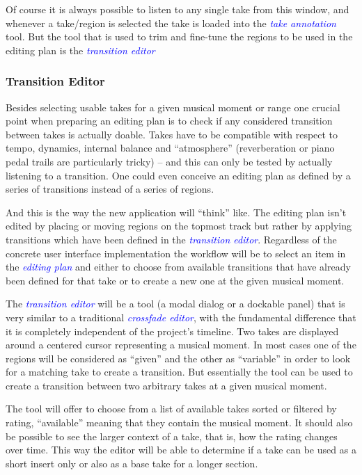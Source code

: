 \documentclass[11pt,a4paper]{article}
\newcommand*{\term}[1]{\textcolor{blue}{\emph{#1}}}
\begin{document}
Of course it is always possible to listen to any single take from this window,
and whenever a take/region is selected the take is loaded into the \term{take
annotation} tool.
But the tool that is used to trim and fine-tune the regions to be used in the
editing plan is the \term{transition editor}

\subsubsection{Transition Editor}

Besides selecting usable takes for a given musical moment or range 
one crucial point when preparing an editing plan is to check if any considered
transition between takes is actually doable.
Takes have to be compatible with respect to tempo, dynamics, internal balance
and “atmosphere” (reverberation or piano pedal trails are particularly tricky)
-- and this can only be tested by actually listening to a transition.
One could even conceive an editing plan as defined by a series of transitions
instead of a series of regions.

And this is the way the new application will “think” like.
The editing plan isn't edited by placing or moving regions on the topmost track but
rather by applying transitions which have been defined in the \term{transition
editor}. Regardless of the concrete user interface implementation the workflow
will be to select an item in the \term{editing plan} and either to choose from
available transitions that have already been defined for that take or to create a
new one at the given musical moment.

The \term{transition editor} will be a tool (a modal dialog or a dockable panel)
that is very similar to a traditional \term{crossfade editor}, with the fundamental
difference that it is completely independent of the project's timeline.
Two takes are displayed around a centered cursor representing a
musical moment. In most cases one of the regions will be considered as “given” and
the other as “variable” in order to look for a matching take to create a transition.
But essentially the tool can be used to create a transition between two arbitrary
takes at a given musical moment.

The tool will offer to choose from a list of available takes sorted or filtered
by rating, “available” meaning that they contain the musical moment.
It should also be possible to see the larger context of a take, that is, how the
rating changes over time. This way the editor will be able to determine if a take
can be used as a short insert only or also as a base take for a longer section.
\end{document}

